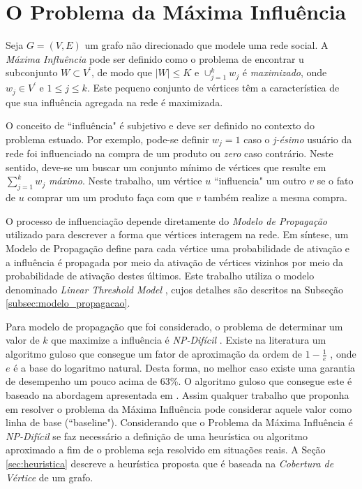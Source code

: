 \documentclass[12pt]{article}
\begin{document}
\section{O Problema da Máxima Influência}
\label{sec:prob_max_influencia}

Seja $G=(V,E)$ um grafo não direcionado que modele uma rede social. A \textit{Máxima Influência} pode ser definido como o problema de encontrar u subconjunto $W \subset V^{'}${}, de modo que $\left\vert W \right\vert\leq K$ e $\cup_{j=1}^{k} w_{j}$ é \textit{maximizado}, onde $w_j \in V^{'}$ e $ 1 \leq j \leq k$.
Este pequeno conjunto de vértices têm a característica de que sua influência agregada na rede é maximizada.

O conceito de ``influência"{} é subjetivo e deve ser definido no contexto do problema estuado. Por exemplo, pode-se definir $w_{j} = 1$ caso o \textit{j-ésimo} usuário da rede foi influenciado na compra de um produto ou \textit{zero} caso contrário. Neste sentido, deve-se um buscar um conjunto mínimo de vértices que resulte em $\sum_{j=1}^{k} w_{j}$ \textit{máximo}. Neste trabalho, um vértice $u$ ``influencia" um outro $v$ se o fato de $u$ comprar um um produto faça com que $v$ também realize a mesma compra.

O processo de influenciação depende diretamente do \textit{Modelo de Propagação} utilizado para descrever a forma que vértices interagem na rede. Em síntese, um Modelo de Propagação define para cada vértice uma probabilidade de ativação e a influência é propagada por meio da ativação de vértices vizinhos por meio da probabilidade de ativação destes últimos. Este trabalho utiliza o modelo denominado \textit{Linear Threshold Model} \cite{granovetter1978threshold, schelling2006micromotives}{}, cujos detalhes são descritos na Subseção \ref{subsec:modelo_propagacao}.

Para modelo de propagação que foi considerado, o problema de determinar um valor de $k$ que maximize a influência é \textit{NP-Difícil} \cite{Garey:1979:CIG:578533,kempe2003maximizing}{}. Existe na literatura um algoritmo guloso que consegue um fator de aproximação da ordem de $1-\frac{1}{e}$ \cite{Hochbaum:1996:ACP:241938.241941}, onde $e$ é a base do logaritmo natural. Desta forma, no melhor caso existe uma garantia de desempenho um pouco acima de 63\%. O algoritmo guloso que consegue este é baseado na abordagem apresentada em \cite{domingos2001mining}. Assim qualquer trabalho  que proponha em resolver o problema da Máxima Influência pode considerar aquele valor como linha de base (``baseline"). Considerando que o Problema da Máxima Influência é \textit{NP-Difícil} se faz necessário a definição de uma heurística ou algoritmo aproximado a fim de o problema seja resolvido em situações reais. A Seção \ref{sec:heuristica} descreve a heurística proposta que é baseada na \textit{Cobertura de Vértice} \cite{Cormen:2009:IAT:1614191}{} de um grafo.
\end{document}
